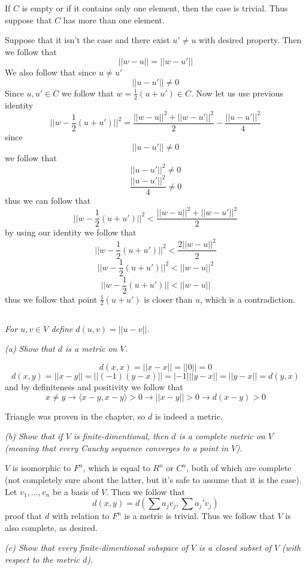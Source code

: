 \documentclass[11pt,oneside,titlepage]{book}
\newcommand{\eangle}[1]{\langle #1 \rangle}
\begin{document}
If $C$ is empty or if it contains only one element, then the case is trivial. Thus suppose that
$C$ has more than one element.

Suppose that it isn't the case and there exist $u' \neq u$ with desired property. Then we
follow that
$$||w - u|| = ||w - u'||$$
We also follow that since $u \neq u'$
$$||u - u'|| \neq 0$$
Since $u, u' \in C$ we follow that $w = \frac{1}{2}(u + u') \in C$. Now let us use previous
identity
$$||w - \frac{1}{2}(u + u')||^2 = \frac{||w - u||^2 + ||w - u'||^2}{2} - \frac{||u - u'||^2}{4}$$
since
$$||u - u'|| \neq 0$$
we follow that
$$||u - u'||^2 \neq 0$$
$$\frac{||u - u'||^2}{4} \neq 0$$
thus we can follow that
$$||w - \frac{1}{2}(u + u')||^2 < \frac{||w - u||^2 + ||w - u'||^2}{2}$$
by using our identity we follow that
$$||w - \frac{1}{2}(u + u')||^2 < \frac{2||w - u||^2}{2}$$
$$||w - \frac{1}{2}(u + u')||^2 < ||w - u||^2$$
$$||w - \frac{1}{2}(u + u')|| < ||w - u||$$
thus we follow that point $\frac{1}{2}(u + u')$  is closer than $u$, which is a contradiction.

\subsection{}

\textit{For $u, v \in V$ define $d(u, v) = ||u - v||$.}

\textit{(a) Show that $d$ is a metric on $V$.}

$$d(x, x) = ||x - x|| = ||0|| = 0$$
$$d(x, y) = ||x - y|| = ||(-1)(y - x)|| = |-1|||y - x|| = ||y - x|| = d(y, x)$$
and by definiteness and positivity we follow that
$$x \neq y \to \eangle{x - y, x - y} > 0 \to ||x - y|| > 0 \to d(x - y) > 0$$

Triangle was proven in the chapter, so $d$ is indeed a metric.

\textit{(b) Show that if $V$ is finite-dimentional, then $d$ is a complete metric
  on $V$ (meaning that every Cauchy sequence converges to a point in $V$).}

$V$ is isomorphic to $F^n$, which is equal to $R^n$ or $C^n$, both of which are complete
(not completely sure about the latter, but it's safe to assume that it is the case).
Let $v_1, ..., v_n$ be a basis of $V$. Then we follow that
$$d(x, y) = d(\sum {a_j v_j}, \sum {a_j' v_j})$$
proof that $d$ with relation to $F^n$ is a metric is trivial.
Thus we follow that $V$ is also complete, as desired.

\textit{(c) Show that every finite-dimentional subspace of $V$ is a closed subset of
  $V$ (with respect to the metric $d$).}
\end{document}
